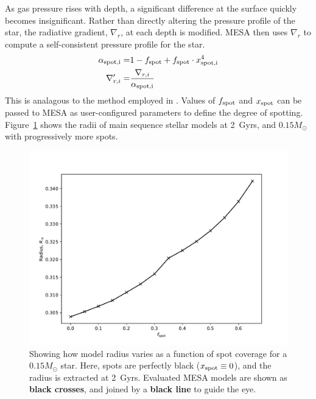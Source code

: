 As gas pressure rises with depth, a significant difference at the surface quickly becomes insignificant.
Rather than directly altering the pressure profile of the star, the radiative gradient, $\nabla_r$, at each depth is modified. MESA then uses $\nabla_r$ to compute a self-consistent pressure profile for the star.
\begin{align}
    \alpha_{\rm spot, i} =& 1 - f_{\rm spot} + f_{\rm spot} \cdot x_{\rm spot, i}^4 \\
    \nabla_{r,i}' =& \frac{\nabla_{r,i}}{\alpha_{\rm spot, i}}
\end{align}
This is analagous to the method employed in \citet{sommers2015}.
Values of $f_{\rm spot}$ and $x_{\rm spot}$ can be passed to MESA as user-configured parameters to define the degree of spotting. Figure~\ref{fig:modelling:spotted model radii at 2Gyrs} shows the radii of main sequence stellar models at 2~Gyrs, and $0.15 M_\odot$ with progressively more spots.
\begin{figure}
    \centering
    \includegraphics[width=\textwidth]{figures/modelling/spotted_model_radii_at_2gyrs.pdf}
    \caption{Showing how model radius varies as a function of spot coverage for a $0.15 M_\odot$ star. Here, spots are perfectly black ($x_{\rm spot} \equiv 0$), and the radius is extracted at 2~Gyrs. Evaluated MESA models are shown as {\bf black crosses}, and joined by a {\bf black line} to guide the eye.}
    \label{fig:modelling:spotted model radii at 2Gyrs}
\end{figure}


